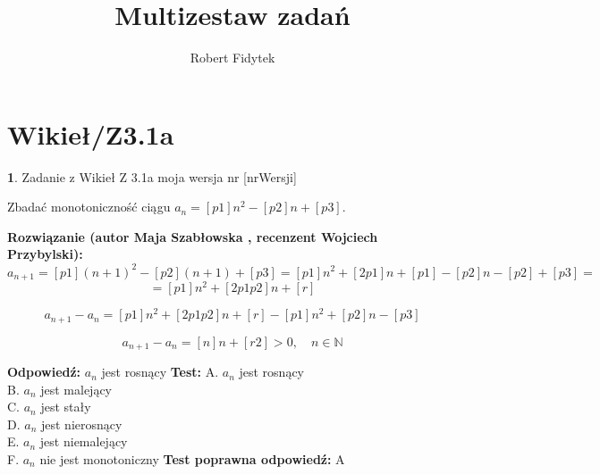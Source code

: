 \documentclass[12pt, a4paper]{article}
\title{Multizestaw zadań}
\author{Robert Fidytek}
\date{}
\theoremstyle{definition} %
\newtheorem{zad}{}
\newcommand{\kategoria}[1]{\section{#1}} %
\newcommand{\zadStart}[1]{\begin{zad}#1\newline} %
\newcommand{\zadStop}{\end{zad}}   %
\newcommand{\rozwStart}[2]{\noindent \textbf{Rozwiązanie (autor #1 , recenzent #2): }\newline} %
\newcommand{\rozwStop}{\newline}                                            %
\newcommand{\odpStart}{\noindent \textbf{Odpowiedź:}\newline}    %
\newcommand{\odpStop}{\newline}                                             %
\newcommand{\testStart}{\noindent \textbf{Test:}\newline} %
\newcommand{\testStop}{\newline} %
\newcommand{\kluczStart}{\noindent \textbf{Test poprawna odpowiedź:}\newline} %
\newcommand{\kluczStop}{\newline} %
\begin{document}
\maketitle


\kategoria{Wikieł/Z3.1a}
\zadStart{Zadanie z Wikieł Z 3.1a moja wersja nr [nrWersji]}


Zbadać monotoniczność ciągu $a_{n}=[p1]n^{2}-[p2]n+[p3]$.
\zadStop

\rozwStart{Maja Szabłowska}{Wojciech Przybylski}
$$a_{n+1}=[p1](n+1)^{2}-[p2](n+1)+[p3]=[p1]n^{2}+[2p1]n+[p1]-[p2]n-[p2]+[p3]=$$
$$=[p1]n^{2}+[2p1p2]n+[r]$$

$$a_{n+1}-a_{n}=[p1]n^{2}+[2p1p2]n+[r]-[p1]n^{2}+[p2]n-[p3]$$

$$a_{n+1}-a_{n}=[n]n+[r2] >0, \quad n\in\mathbb{N}$$
\rozwStop


\odpStart
$a_{n}$ jest rosnący
\odpStop
\testStart
A. $a_{n}$ jest rosnący\\
B. $a_{n}$ jest malejący\\
C. $a_{n}$ jest stały\\
D. $a_{n}$ jest nierosnący\\
E. $a_{n}$ jest niemalejący\\
F. $a_{n}$ nie jest monotoniczny
\testStop
\kluczStart
A
\kluczStop
\end{document}
